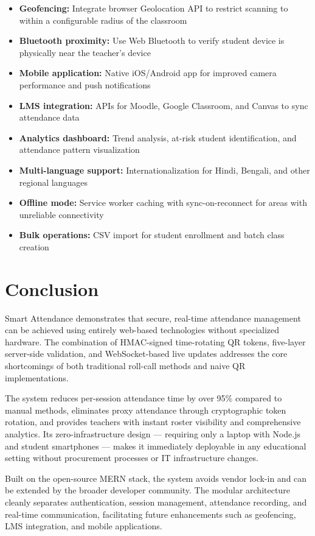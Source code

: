 \documentclass[conference]{IEEEtran}
\begin{document}
\begin{itemize}
\item \textbf{Geofencing:} Integrate browser Geolocation API to restrict scanning to within a configurable radius of the classroom
\item \textbf{Bluetooth proximity:} Use Web Bluetooth to verify student device is physically near the teacher's device
\item \textbf{Mobile application:} Native iOS/Android app for improved camera performance and push notifications
\item \textbf{LMS integration:} APIs for Moodle, Google Classroom, and Canvas to sync attendance data
\item \textbf{Analytics dashboard:} Trend analysis, at-risk student identification, and attendance pattern visualization
\item \textbf{Multi-language support:} Internationalization for Hindi, Bengali, and other regional languages
\item \textbf{Offline mode:} Service worker caching with sync-on-reconnect for areas with unreliable connectivity
\item \textbf{Bulk operations:} CSV import for student enrollment and batch class creation
\end{itemize}

\section{Conclusion}

Smart Attendance demonstrates that secure, real-time attendance management can be achieved using entirely web-based technologies without specialized hardware. The combination of HMAC-signed time-rotating QR tokens, five-layer server-side validation, and WebSocket-based live updates addresses the core shortcomings of both traditional roll-call methods and naive QR implementations.

The system reduces per-session attendance time by over 95\% compared to manual methods, eliminates proxy attendance through cryptographic token rotation, and provides teachers with instant roster visibility and comprehensive analytics. Its zero-infrastructure design --- requiring only a laptop with Node.js and student smartphones --- makes it immediately deployable in any educational setting without procurement processes or IT infrastructure changes.

Built on the open-source MERN stack, the system avoids vendor lock-in and can be extended by the broader developer community. The modular architecture cleanly separates authentication, session management, attendance recording, and real-time communication, facilitating future enhancements such as geofencing, LMS integration, and mobile applications.
\end{document}
